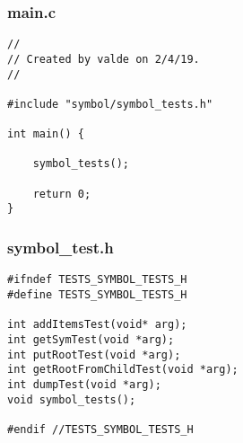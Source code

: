 \documentclass[a4paper]{article}
\begin{document}
\subsubsection{main.c}
\begin{verbatim}
//
// Created by valde on 2/4/19.
//

#include "symbol/symbol_tests.h"

int main() {

	symbol_tests();

	return 0;
}
\end{verbatim}

\subsubsection{symbol\_test.h}
\begin{verbatim}
#ifndef TESTS_SYMBOL_TESTS_H
#define TESTS_SYMBOL_TESTS_H

int addItemsTest(void* arg);
int getSymTest(void *arg);
int putRootTest(void *arg);
int getRootFromChildTest(void *arg);
int dumpTest(void *arg);
void symbol_tests();

#endif //TESTS_SYMBOL_TESTS_H
\end{verbatim}
\end{document}
